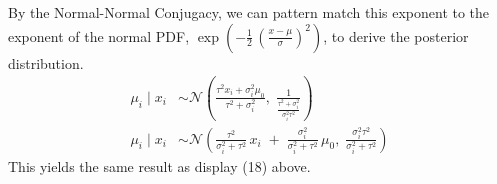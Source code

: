 \documentclass[letterpaper, 11pt]{extarticle}
\begin{document}
By the Normal-Normal Conjugacy, we can pattern match this exponent to the exponent of the normal PDF, $\exp\!\left( -\tfrac{1}{2}\,\left( \frac{x - \mu}{\sigma} \right)^{2} \right)$, to derive the posterior distribution.
\begin{align}
\mu_i \mid x_i &\sim \mathcal{N}\!\left(
\frac{\tau^{2} x_i + \sigma_i^{2} \mu_0}{\tau^{2} + \sigma_i^{2}},
\;
\frac{1}{\frac{\tau^{2} + \sigma_i^{2}}{\sigma_i^{2}\tau^{2}}}
\right)
\\[1ex]
\mu_i \mid x_i &\sim \mathcal{N}\!\left(
\frac{\tau^{2}}{\sigma_i^{2} + \tau^{2}}\,x_i
\;+\;
\frac{\sigma_i^{2}}{\sigma_i^{2} + \tau^{2}}\,\mu_0,
\;
\frac{\sigma_i^{2}\tau^{2}}{\sigma_i^{2} + \tau^{2}}
\right)
\end{align}
This yields the same result as display (18) above. 
\newpage


\end{document}
